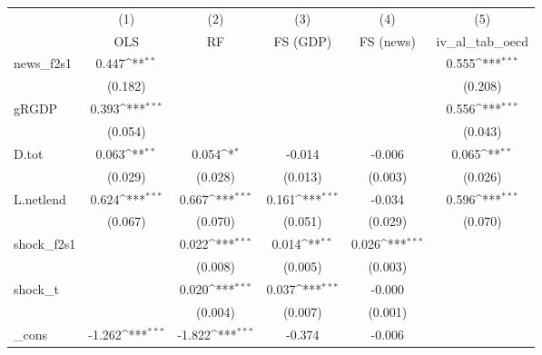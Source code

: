{
\def\sym#1{\ifmmode^{#1}\else\(^{#1}\)\fi}
\begin{tabular}{l*{5}{c}}
\toprule
            &\multicolumn{1}{c}{(1)}&\multicolumn{1}{c}{(2)}&\multicolumn{1}{c}{(3)}&\multicolumn{1}{c}{(4)}&\multicolumn{1}{c}{(5)}\\
            &\multicolumn{1}{c}{OLS}&\multicolumn{1}{c}{RF}&\multicolumn{1}{c}{FS (GDP)}&\multicolumn{1}{c}{FS (news)}&\multicolumn{1}{c}{iv\_al\_tab\_oecd}\\
\midrule
news\_f2s1   &       0.447\sym{**} &                     &                     &                     &       0.555\sym{***}\\
            &     (0.182)         &                     &                     &                     &     (0.208)         \\
\addlinespace
gRGDP       &       0.393\sym{***}&                     &                     &                     &       0.556\sym{***}\\
            &     (0.054)         &                     &                     &                     &     (0.043)         \\
\addlinespace
D.tot       &       0.063\sym{**} &       0.054\sym{*}  &      -0.014         &      -0.006         &       0.065\sym{**} \\
            &     (0.029)         &     (0.028)         &     (0.013)         &     (0.003)         &     (0.026)         \\
\addlinespace
L.netlend   &       0.624\sym{***}&       0.667\sym{***}&       0.161\sym{***}&      -0.034         &       0.596\sym{***}\\
            &     (0.067)         &     (0.070)         &     (0.051)         &     (0.029)         &     (0.070)         \\
\addlinespace
shock\_f2s1  &                     &       0.022\sym{***}&       0.014\sym{**} &       0.026\sym{***}&                     \\
            &                     &     (0.008)         &     (0.005)         &     (0.003)         &                     \\
\addlinespace
shock\_t     &                     &       0.020\sym{***}&       0.037\sym{***}&      -0.000         &                     \\
            &                     &     (0.004)         &     (0.007)         &     (0.001)         &                     \\
\addlinespace
\_cons      &      -1.262\sym{***}&      -1.822\sym{***}&      -0.374         &      -0.006         &                     \\

\end{tabular}}
